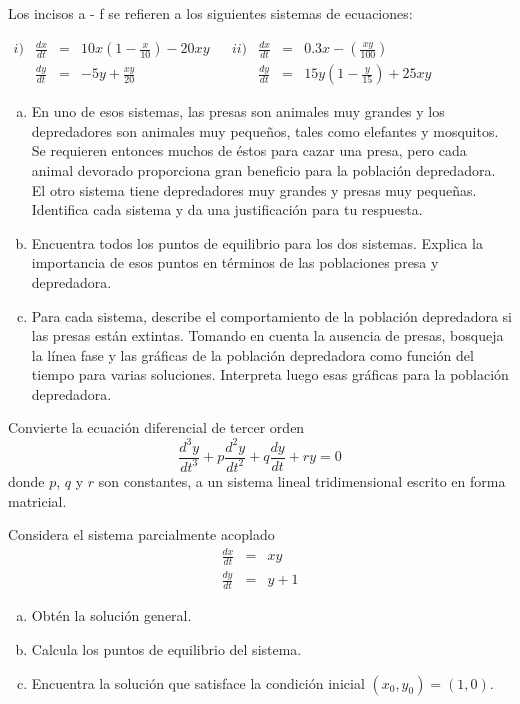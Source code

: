 \documentclass[12pt]{exam}
\begin{document}
\begin{questions}
     \question
     Los incisos a - f se refieren a los siguientes sistemas de ecuaciones:
     
     $
     \begin{array}{lrclclrcl}
        i)&\frac{dx}{dt}& = & 10x\left(1-\frac{x}{10}\right)-20xy& &ii)& \frac{dx}{dt} & = & 0.3x-\left(\frac{xy}{100}\right)\\
        & \frac{dy}{dt} & = & -5y+\frac{xy}{20} & & &\frac{dy}{dt}& = & 15y\left(1-\frac{y}{15}\right)+25xy
     \end{array}
     $
     \begin{enumerate}[a)]
         \item En uno de esos sistemas, las presas son animales muy grandes y los depredadores son animales muy pequeños, tales como elefantes y mosquitos. Se requieren entonces muchos de éstos para cazar una presa, pero cada animal devorado proporciona gran beneficio para la población depredadora. El otro sistema tiene depredadores muy grandes y presas muy pequeñas. Identifica cada sistema y da una justificación para tu respuesta.
         \item Encuentra todos los puntos de equilibrio para los dos sistemas. Explica la importancia de esos puntos en términos de las poblaciones presa y depredadora.
         \item Para cada sistema, describe el comportamiento de la población depredadora si las presas están extintas. Tomando en cuenta la ausencia de presas, bosqueja la línea fase y las gráficas de la población depredadora como función del tiempo para varias soluciones. Interpreta luego esas gráficas para la población depredadora.
     \end{enumerate}

     \question%
     Convierte la ecuación diferencial de tercer orden $$\frac{d^3y}{dt^3}+p\frac{d^2y}{dt^2}+q\frac{dy}{dt}+ry=0$$ donde $p$, $q$ y $r$ son constantes, a un sistema lineal tridimensional escrito en forma matricial.

     \question%
     Considera el sistema parcialmente acoplado $$\begin{array}{rcl}
          \frac{dx}{dt}&=&xy  \\
          \frac{dy}{dt}&=&y+1 
     \end{array}$$
     \begin{enumerate}[a)]
         \item Obtén la solución general.
         \item Calcula los puntos de equilibrio del sistema.
         \item Encuentra la solución que satisface la condición inicial $(x_0,y_0)=(1,0)$.
     \end{enumerate}



    \end{questions}
\end{document}
